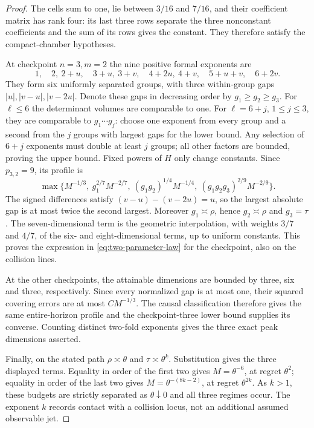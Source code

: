 \begin{proof}
The cells sum to one, lie between $3/16$ and $7/16$, and their coefficient
matrix has rank four: its last three rows separate the three nonconstant
coefficients and the sum of its rows gives the constant. They therefore
satisfy the compact-chamber hypotheses.

At checkpoint $n=3,m=2$ the nine positive formal exponents are
\[
 1,\quad 2,\ 2+u,\quad 3+u,\ 3+v,\quad
 4+2u,\ 4+v,\quad 5+u+v,\quad 6+2v.
\]
They form six uniformly separated groups, with three within-group gaps
$|u|,|v-u|,|v-2u|$. Denote these gaps in decreasing order by
$g_1\ge g_2\ge g_3$. For $\ell\le6$ the determinant volumes
are comparable to one. For $\ell=6+j$, $1\le j\le3$, they are
comparable to $g_1\cdots g_j$: choose one exponent from every group
and a second from the $j$ groups with largest gaps for the lower bound.
Any selection of $6+j$ exponents must double at least $j$ groups;
all other factors are bounded, proving the upper bound. Fixed powers of
$H$ only change constants. Since $p_{3,2}=9$, its profile is
\[
 \max\{M^{-1/3},\ g_1^{2/7}M^{-2/7},\
              (g_1g_2)^{1/4}M^{-1/4},\
              (g_1g_2g_3)^{2/9}M^{-2/9}\}.
\]
The signed differences satisfy $(v-u)-(v-2u)=u$, so the largest
absolute gap is at most twice the second largest. Moreover
$g_1\asymp\rho$, hence $g_2\asymp\rho$ and $g_3=\tau$.
The seven-dimensional term is the geometric interpolation, with weights
$3/7$ and $4/7$, of the six- and eight-dimensional terms, up to uniform
constants. This proves the expression in \eqref{eq:two-parameter-law}
for the checkpoint, also on the collision lines.

At the other checkpoints, the attainable dimensions are bounded by three,
six and three, respectively. Since every normalized gap is at most one,
their squared covering errors are at most $CM^{-1/3}$. The causal
classification therefore gives the same entire-horizon profile and the
checkpoint-three lower bound supplies its converse. Counting distinct
two-fold exponents gives the three exact peak dimensions asserted.

Finally, on the stated path $\rho\asymp\theta$ and
$\tau\asymp\theta^k$. Substitution gives the three displayed terms.
Equality in order of the first two gives $M=\theta^{-6}$, at regret
$\theta^2$; equality in order of the last two gives
$M=\theta^{-(8k-2)}$, at regret $\theta^{2k}$. As $k>1$, these
budgets are strictly separated as $\theta\downarrow0$ and all three
regimes occur. The exponent $k$ records contact with a collision locus,
not an additional assumed observable jet.
\end{proof}
